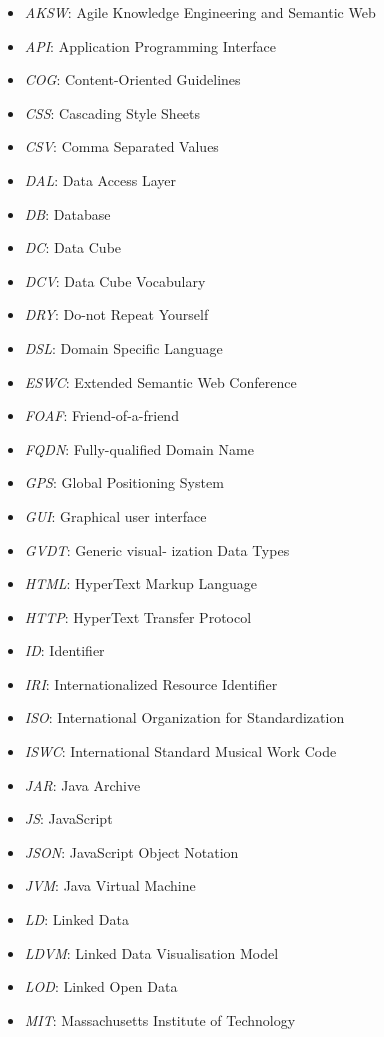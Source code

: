 \begin{itemize}\item \emph{AKSW}:	Agile Knowledge Engineering and Semantic Web
\item \emph{API}:	Application Programming Interface
\item \emph{COG}:	Content-Oriented Guidelines
\item \emph{CSS}:	Cascading Style Sheets
\item \emph{CSV}:	Comma Separated Values
\item \emph{DAL}:	Data Access Layer
\item \emph{DB}:	Database
\item \emph{DC}:	Data Cube
\item \emph{DCV}:	Data Cube Vocabulary
\item \emph{DRY}:	Do-not Repeat Yourself
\item \emph{DSL}:	Domain Specific Language
\item \emph{ESWC}:	Extended Semantic Web Conference
\item \emph{FOAF}:	Friend-of-a-friend
\item \emph{FQDN}:	Fully-qualified Domain Name
\item \emph{GPS}:	Global Positioning System
\item \emph{GUI}:	Graphical user interface
\item \emph{GVDT}:	Generic visual- ization Data Types
\item \emph{HTML}:	HyperText Markup Language
\item \emph{HTTP}:	HyperText Transfer Protocol
\item \emph{ID}:	Identifier
\item \emph{IRI}:	Internationalized Resource Identifier
\item \emph{ISO}:	International Organization for Standardization
\item \emph{ISWC}:	International Standard Musical Work Code
\item \emph{JAR}:	Java Archive
\item \emph{JS}:	JavaScript
\item \emph{JSON}:	JavaScript Object Notation
\item \emph{JVM}:	Java Virtual Machine
\item \emph{LD}:	Linked Data
\item \emph{LDVM}:	Linked Data Visualisation Model
\item \emph{LOD}:	Linked Open Data
\item \emph{MIT}:	Massachusetts Institute of Technology

\end{itemize}
